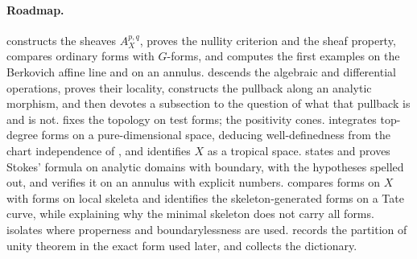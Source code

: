 \paragraph{Roadmap.}
 constructs the sheaves $A_X^{p,q}$, proves the
nullity criterion and the sheaf property, compares ordinary forms with
$G$-forms, and computes the first examples on the Berkovich affine line and
on an annulus.   descends the algebraic and
differential operations, proves their locality, constructs the pullback along
an analytic morphism, and then devotes a subsection to the question of what
that pullback is and is not.   fixes the topology on
test forms;  the positivity cones.
 integrates top-degree forms on a pure-dimensional
space, deducing well-definedness from the chart independence of
, and identifies $X$ as a tropical space.
 states and proves Stokes' formula on analytic domains
with boundary, with the hypotheses spelled out, and verifies it on an annulus
with explicit numbers.   compares forms on $X$ with
forms on local skeleta and identifies the skeleton-generated forms on a Tate
curve, while explaining why the minimal skeleton does not carry all forms.
 isolates where properness and boundarylessness are
used.   records the partition of
unity theorem in the exact form used later, and
 collects the dictionary.

